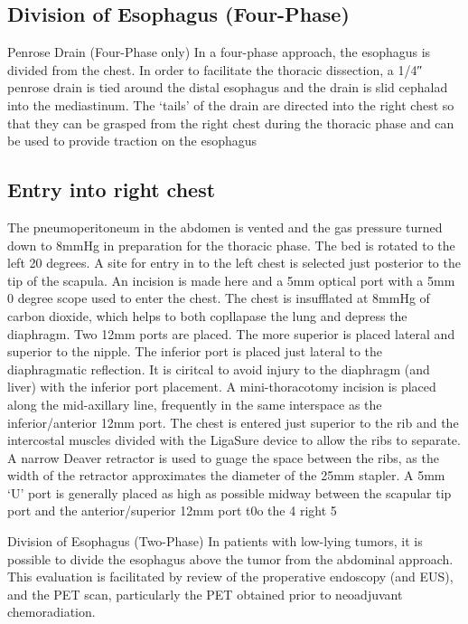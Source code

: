\documentclass[
]{book}
\begin{document}
\hypertarget{division-of-esophagus-four-phase}{%
\subsection{Division of Esophagus (Four-Phase)}\label{division-of-esophagus-four-phase}}

Penrose Drain (Four-Phase only) In a four-phase approach, the esophagus is divided from the chest. In order to facilitate the thoracic dissection, a 1/4″ penrose drain is tied around the distal esophagus and the drain is slid cephalad into the mediastinum. The `tails' of the drain are directed into the right chest so that they can be grasped from the right chest during the thoracic phase and can be used to provide traction on the esophagus

\hypertarget{entry-into-right-chest}{%
\subsection{Entry into right chest}\label{entry-into-right-chest}}

The pneumoperitoneum in the abdomen is vented and the gas pressure turned down to 8mmHg in preparation for the thoracic phase. The bed is rotated to the left 20 degrees. A site for entry in to the left chest is selected just posterior to the tip of the scapula. An incision is made here and a 5mm optical port with a 5mm 0 degree scope used to enter the chest. The chest is insufflated at 8mmHg of carbon dioxide, which helps to both copllapase the lung and depress the diaphragm. Two 12mm ports are placed. The more superior is placed lateral and superior to the nipple. The inferior port is placed just lateral to the diaphragmatic reflection. It is ciritcal to avoid injury to the diaphragm (and liver) with the inferior port placement. A mini-thoracotomy incision is placed along the mid-axillary line, frequently in the same interspace as the inferior/anterior 12mm port. The chest is entered just superior to the rib and the intercostal muscles divided with the LigaSure device to allow the ribs to separate. A narrow Deaver retractor is used to guage the space between the ribs, as the width of the retractor approximates the diameter of the 25mm stapler. A 5mm `U' port is generally placed as high as possible midway between the scapular tip port and the anterior/superior 12mm port t0o the 4 right 5

Division of Esophagus (Two-Phase)
In patients with low-lying tumors, it is possible to divide the esophagus above the tumor from the abdominal approach. This evaluation is facilitated by review of the properative endoscopy (and EUS), and the PET scan, particularly the PET obtained prior to neoadjuvant chemoradiation.
\end{document}
